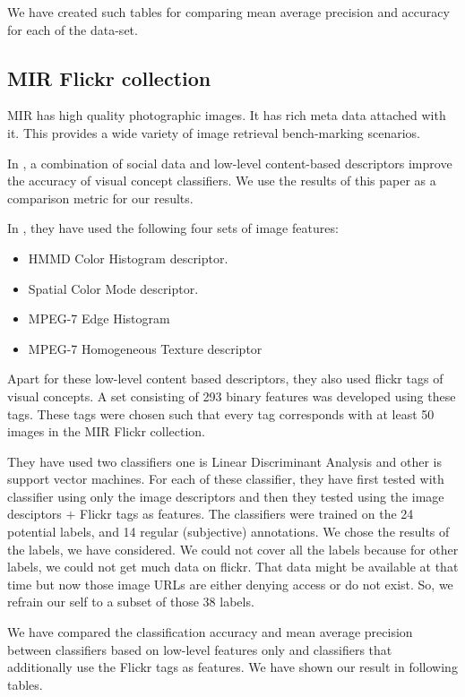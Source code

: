 We have created such tables for comparing mean average precision and accuracy for each of the data-set.

\subsection{MIR Flickr collection }
MIR has high quality photographic images. It has rich meta data attached with it. This provides a wide variety of image retrieval bench-marking scenarios.

In \citep{MIRresults}, a combination of social data and low-level content-based descriptors improve the accuracy of visual concept 
classifiers. We use the results of this paper as a comparison metric for our results.

In \citep{MIRresults}, they have used the following four sets of image features:
\begin{itemize}
\item HMMD Color Histogram descriptor.
\item Spatial Color Mode descriptor.
\item MPEG-7 Edge Histogram
\item MPEG-7 Homogeneous Texture descriptor
\end{itemize}

Apart for these low-level content based descriptors, they also used flickr tags of visual concepts.  A set consisting of 293 binary features was developed using these tags. These tags were chosen such that every tag corresponds with at least 50 images in the MIR Flickr collection.

They have used two classifiers one is Linear Discriminant Analysis  and other is support vector machines. For each of these classifier, they have first tested with classifier using only the image descriptors and then they tested using the image desciptors $+$ Flickr tags as features. The classifiers were trained on the 24 potential labels, and 14 regular (subjective) annotations. We chose the results of the labels, we have considered. We could not cover all the labels because for other labels, we could not get much data on flickr. That data might be available at that time but now those image URLs are either denying access or do not exist. So, we refrain our self to a subset of those 38 labels.

We have compared the classification accuracy and mean average precision between  classifiers based on low-level features only and classifiers that additionally use the Flickr tags as features.
We have shown our result in following tables. 


